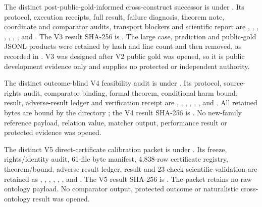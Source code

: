 The distinct post-public-gold-informed cross-construct successor is under
. Its protocol,
execution receipts, full result, failure diagnosis, theorem note, coordinate
and comparator audits, transport blockers and scientific report are
,
, ,
,
,
,
,  and
. The V3 result SHA-256 is
.
The large case, prediction and public-gold JSONL products were retained by
hash and line count and then removed, as recorded in
. V3 was designed after V2 public gold
was opened, so it is public development evidence only and supplies no protected
or independent authority.

The distinct outcome-blind V4 feasibility audit is under
. Its
protocol, source-rights audit, comparator binding, formal theorem, conditional
harm bound, result, adverse-result ledger and verification receipt are
,
, ,
,
, ,
 and
. All retained bytes are bound by the directory
; the V4 result SHA-256 is
.
No new-family reference payload, relation value, matcher output, performance
result or protected evidence was opened.

The distinct V5 direct-certificate calibration packet is under
. Its
freeze, rights/identity audit, 61-file byte manifest, 4,838-row certificate
registry, theorem/bound, adverse-result ledger, result and 23-check scientific
validation are retained as ,
, ,
, ,
,  and
. The V5 result SHA-256 is
.
The packet retains no raw ontology payload. No comparator output, protected
outcome or naturalistic cross-ontology result was opened.

